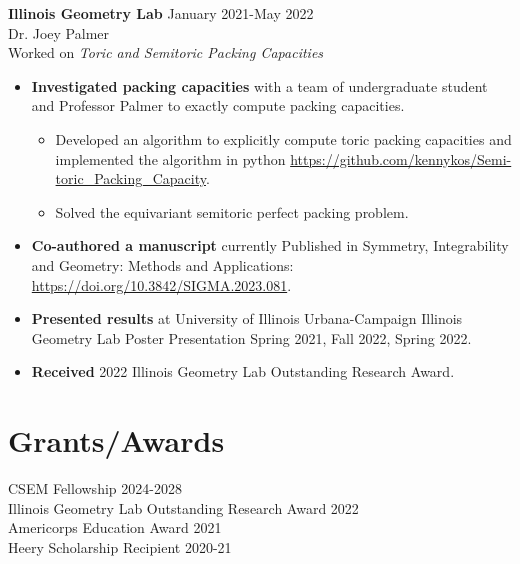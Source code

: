 \documentclass[resmargin, 10pt]{res} %
\begin{document}
\begin{resume}
\vspace{-8pt}
{\bf Illinois Geometry Lab} \hfill January 2021-May 2022 \\
Dr. Joey Palmer \\
Worked on {\sl Toric and Semitoric Packing Capacities}
\begin{itemize}[itemsep=0em]
    \item \textbf{Investigated packing capacities} with a team of undergraduate student and Professor Palmer to exactly compute packing capacities.
    \begin{itemize}[itemsep=0em]
        \item Developed an algorithm to explicitly compute toric packing capacities and implemented the algorithm in python \url{https://github.com/kennykos/Semi-toric_Packing_Capacity}.
        \item Solved the equivariant semitoric perfect packing problem.
    \end{itemize}
    \item \textbf{Co-authored a manuscript} currently Published in Symmetry, Integrability and Geometry: Methods and Applications: \url{https://doi.org/10.3842/SIGMA.2023.081}.
    \item \textbf{Presented results} at University of Illinois Urbana-Campaign Illinois Geometry Lab Poster Presentation Spring 2021, Fall 2022, Spring 2022.
    \item \textbf{Received} 2022 Illinois Geometry Lab Outstanding Research Award.
\end{itemize}

\vspace{-8pt}
\section{Grants/Awards}

CSEM Fellowship \hfill 2024-2028 \\
Illinois Geometry Lab Outstanding Research Award \hfill 2022\\
Americorps Education Award  \hfill 2021 \\
Heery Scholarship Recipient \hfill 2020-21\\


\vspace{-8pt}

\end{resume}
\end{document}
